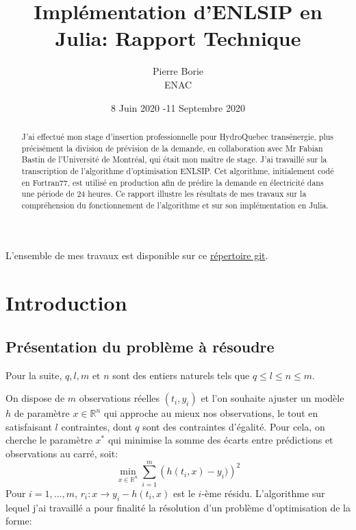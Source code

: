 \documentclass[a4paper,11pt]{article}
\numberwithin{equation}{section}
\begin{document}
\title{Implémentation d'ENLSIP en Julia: Rapport Technique}
\author{Pierre Borie \\ ENAC}

\date{8 Juin 2020 -11 Septembre 2020}
\maketitle



	
\begin{abstract}
J'ai effectué mon stage d'insertion professionnelle pour HydroQuebec transénergie, plus précisément la division de prévision de la demande, en collaboration avec Mr Fabian Bastin de l'Université de Montréal, qui était mon maître de stage. J'ai travaillé sur la transcription de l'algorithme d'optimisation ENLSIP. Cet algorithme, initialement codé en Fortran77, est utilisé en production afin de prédire la demande en électricité dans une période de 24 heures. Ce rapport illustre les résultats de mes travaux sur la compréhension du fonctionnement de l'algorithme et sur son implémentation en Julia. 
\end{abstract}

L'ensemble de mes travaux est disponible sur ce \href{https://github.com/pierre-borie/nlcls}{répertoire git}.

\tableofcontents

\section{Introduction} \label{intro}
\subsection{Présentation du problème à résoudre} \label{presentation}


Pour la suite, $q,l,m\text{ et }n$ sont des entiers naturels tels que $q \leq l \leq n \leq m$. 

On dispose de $m$ observations réelles  $(t_{i},y_{i})$ et l'on souhaite ajuster un modèle $h$ de paramètre $x\in \mathbb{R}^{n}$ qui approche au mieux nos observations, le tout en satisfaisant $l$ contraintes, dont $q$ sont des contraintes d'égalité. Pour cela, on cherche le paramètre $x^{*}$ qui minimise la somme des écarts entre prédictions et observations au carré, soit:
\[
\underset{x \in \mathbb{R}^{n}}{\min} \sum_{i=1}^{m} \left(h(t_{i},x)-y_{i})\right)^{2}
\]
Pour $i=1,\ldots,m$, $r_{i}: x \to y_{i} - h(t_{i},x)$ est le $i$-ème résidu.
L'algorithme sur lequel j'ai travaillé a pour finalité la résolution d'un problème d'optimisation de la forme: 
\end{document}
